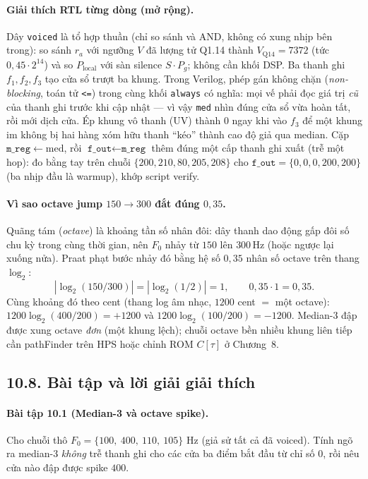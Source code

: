 \paragraph{Giải thích RTL từng dòng (mở rộng).}
Dây \texttt{voiced} là tổ hợp thuần (chỉ so sánh và AND, không có xung nhịp bên trong): so sánh $r_a$ với ngưỡng $V$ đã lượng tử Q1.14 thành $V_{\mathrm{Q14}}=7372$ (tức $0{,}45\cdot 2^{14}$) và so $P_{\mathrm{local}}$ với sàn silence $S\cdot P_g$; không cần khối DSP. Ba thanh ghi $f_1,f_2,f_3$ tạo cửa sổ trượt ba khung. Trong Verilog, phép gán không chặn (\emph{non-blocking}, toán tử \texttt{<=}) trong cùng khối \texttt{always} có nghĩa: mọi vế phải đọc giá trị \emph{cũ} của thanh ghi trước khi cập nhật --- vì vậy \texttt{med} nhìn đúng cửa sổ vừa hoàn tất, rồi mới dịch cửa. Ép khung vô thanh (UV) thành $0$ ngay khi vào $f_3$ để một khung im không bị hai hàng xóm hữu thanh ``kéo'' thành cao độ giả qua median. Cặp $\texttt{m\_reg}\leftarrow\mathrm{med}$, rồi $\texttt{f\_out}\leftarrow\texttt{m\_reg}$ thêm đúng một cấp thanh ghi xuất (trễ một hop): đo bằng tay trên chuỗi $\{200,210,80,205,208\}$ cho $\texttt{f\_out}=\{0,0,0,200,200\}$ (ba nhịp đầu là warmup), khớp script verify.

\paragraph{Vì sao octave jump $150\to 300$ đắt đúng $0{,}35$.}
Quãng tám (\emph{octave}) là khoảng tần số nhân đôi: dây thanh dao động gấp đôi số chu kỳ trong cùng thời gian, nên $F_0$ nhảy từ $150$ lên $300\,\text{Hz}$ (hoặc ngược lại xuống nửa). Praat phạt bước nhảy đó bằng hệ số $0{,}35$ nhân số octave trên thang $\log_2$:
\[
|\log_2(150/300)|=|\log_2(1/2)|=1,\qquad 0{,}35\cdot 1=0{,}35.
\]
Cùng khoảng đó theo cent (thang log âm nhạc, $1200$ cent $=$ một octave): $1200\log_2(400/200)=+1200$ và $1200\log_2(100/200)=-1200$. Median-3 đập được xung octave \emph{đơn} (một khung lệch); chuỗi octave bền nhiều khung liên tiếp cần pathFinder trên HPS hoặc chỉnh ROM $C[\tau]$ ở Chương~8.

\subsection*{10.8. Bài tập và lời giải giải thích}

\paragraph{Bài tập 10.1 (Median-3 và octave spike).}
Cho chuỗi thô $F_0 = \{100,\ 400,\ 110,\ 105\}$ Hz (giả sử tất cả đã voiced). Tính ngõ ra median-3 \emph{không} trễ thanh ghi cho các cửa ba điểm bắt đầu từ chỉ số $0$, rồi nêu cửa nào đập được spike $400$.

